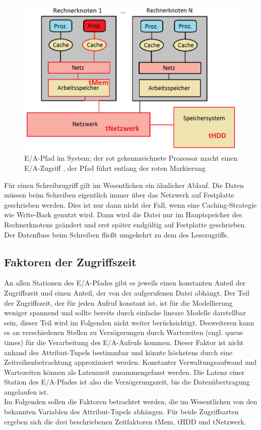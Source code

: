 \documentclass[
	12pt,
	a4paper,
	BCOR10mm,
	DIV14,
	listof=totoc,
	bibliography=totoc,
	headsepline
]{scrreprt}
\begin{document}
\begin{figure}[h]
	\begin{center}
		\includegraphics[width=.43\textwidth]{Bilder/rechnerknoten_ea_pfad.png}
	\end{center}
	\caption{E/A-Pfad im System; der rot gekennzeichnete Prozessor macht einen E/A-Zugriff , der Pfad führt entlang der roten Markierung}
	\label{fig:ea_pfad}
\end{figure}

Für einen Schreibzugriff gilt im Wesentlichen ein ähnlicher Ablauf.
Die Daten müssen beim Schreiben eigentlich immer über das Netzwerk auf Festplatte geschrieben werden. Dies ist nur dann nicht der Fall, wenn eine Caching-Strategie wie Write-Back genutzt wird. Dann wird die Datei nur im Hauptspeicher des Rechnerknotens geändert und erst später endgültig auf Festplatte geschrieben.
Der Datenfluss beim Schreiben fließt umgekehrt zu dem des Lesezugriffs.

\subsection{Faktoren der Zugriffszeit}
An allen Stationen des E/A-Pfades gibt es jeweils einen konstanten Anteil der Zugriffszeit und einen Anteil, der von der aufgerufenen Datei abhängt. 
Der Teil der Zugriffszeit, der für jeden Aufruf konstant ist, ist für die Modellierung weniger spannend und sollte bereits durch einfache lineare Modelle darstellbar sein, dieser Teil wird im Folgenden nicht weiter berücksichtigt.
Desweiteren kann es an verschiedenen Stellen zu Verzögerungen durch Wartezeiten (engl. queue times) für die Verarbeitung des E/A-Aufrufs kommen. Dieser Faktor ist nicht anhand des Attribut-Tupels bestimmbar und könnte höchstens durch eine Zeitreihenbetrachtung approximiert werden. Konstanter Verwaltungsaufwand und Wartezeiten können als Latenzzeit zusammengefasst werden. Die Latenz einer Station des E/A-Pfades ist also die Verzögerungszeit, bis die Datenübertragung angelaufen ist.\\
Im Folgenden sollen die Faktoren betrachtet werden, die im Wesentlichen von den bekannten Variablen des Attribut-Tupels abhängen.
Für beide Zugriffsarten ergeben sich die drei beschriebenen Zeitfaktoren tMem, tHDD und tNetzwerk.
\end{document}
